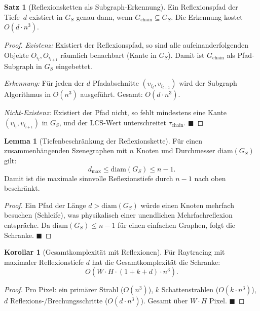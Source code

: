 ﻿\documentclass[a4paper,12pt]{article}
\theoremstyle{definition}
\newtheorem{satz}{Satz}[section]
\newtheorem{lemma}{Lemma}[section]
\newtheorem{korollar}{Korollar}[section]
\begin{document}
\begin{satz}[Reflexionsketten als Subgraph-Erkennung]
  \label{satz:reflexion}
  Ein Reflexionspfad der Tiefe~$d$ existiert in $G_S$ genau dann,
  wenn $G_{\mathrm{chain}} \subseteq G_S$.
  Die Erkennung kostet $O(d \cdot n^3)$.
\end{satz}

\begin{proof}
  \emph{Existenz:} Existiert der Reflexionspfad, so sind alle
  aufeinanderfolgenden Objekte $O_{i_l}, O_{i_{l+1}}$ räumlich
  benachbart (Kante in $G_S$). Damit ist $G_{\mathrm{chain}}$
  als Pfad-Subgraph in $G_S$ eingebettet.

  \emph{Erkennung:} Für jeden der $d$ Pfadabschnitte
  $(v_{i_l}, v_{i_{l+1}})$ wird der Subgraph Algorithmus in
  $O(n^3)$ ausgeführt. Gesamt: $O(d \cdot n^3)$.

  \emph{Nicht-Existenz:} Existiert der Pfad nicht, so fehlt
  mindestens eine Kante $(v_{i_l}, v_{i_{l+1}})$ in $G_S$,
  und der LCS-Wert unterschreitet $\tau_{\mathrm{chain}}$.
  \hfill$\blacksquare$
\end{proof}

\begin{lemma}[Tiefenbeschränkung der Reflexionskette]
  \label{lem:tiefenbeschraenkung}
  Für einen zusammenhängenden Szenegraphen mit $n$ Knoten und
  Durchmesser $\mathrm{diam}(G_S)$ gilt:
  \[
    d_{\max} \leq \mathrm{diam}(G_S) \leq n - 1.
  \]
  Damit ist die maximale sinnvolle Reflexionstiefe durch $n-1$
  nach oben beschränkt.
\end{lemma}

\begin{proof}
  Ein Pfad der Länge $d > \mathrm{diam}(G_S)$ würde einen Knoten
  mehrfach besuchen (Schleife), was physikalisch einer unendlichen
  Mehrfachreflexion entspräche. Da $\mathrm{diam}(G_S) \leq n-1$
  für einen einfachen Graphen, folgt die Schranke.
  \hfill$\blacksquare$
\end{proof}

\begin{korollar}[Gesamtkomplexität mit Reflexionen]
  Für Raytracing mit maximaler Reflexionstiefe $d$ hat die
  Gesamtkomplexität die Schranke:
  \[
    O\!\left(W \cdot H \cdot (1 + k + d) \cdot n^3\right).
  \]
\end{korollar}

\begin{proof}
  Pro Pixel: ein primärer Strahl ($O(n^3)$), $k$ Schattenstrahlen
  ($O(k \cdot n^3)$), $d$ Reflexions-/Brechungsschritte
  ($O(d \cdot n^3)$). Gesamt über $W \cdot H$ Pixel. \hfill$\blacksquare$
\end{proof}
\end{document}

